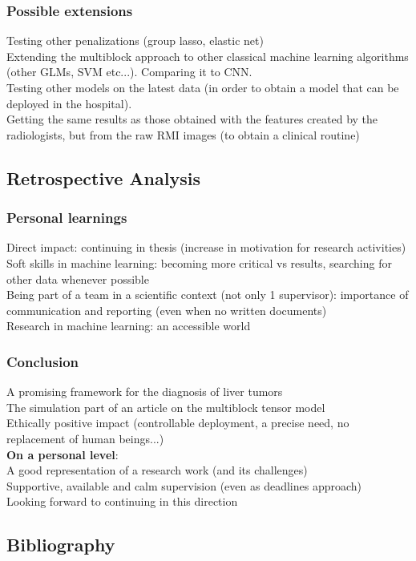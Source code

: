 \documentclass{beamer}
\begin{document}
\begin{frame}
    \frametitle{Possible extensions}
    Testing other penalizations (group lasso, elastic net)\\[10 pt]
    Extending the multiblock approach to other classical machine learning algorithms (other GLMs, SVM etc...). Comparing it to CNN.\\[10 pt]
    Testing other models on the latest data (in order to obtain a model that can be deployed in the hospital).\\[10 pt]
    Getting the same results as those obtained with the features created by the radiologists, but from the raw RMI images (to obtain a clinical routine)
\end{frame}

\begin{frame}
    \section{Retrospective Analysis}
\end{frame}

\begin{frame}
    \frametitle{Personal learnings}
    Direct impact: continuing in thesis (increase in motivation for research activities)\\[10 pt]
    Soft skills in machine learning: becoming more critical vs results, searching for other data whenever possible\\[10 pt]
    Being part of a team in a scientific context (not only 1 supervisor): importance of communication and reporting (even when no written documents)\\[10 pt]
    Research in machine learning: an accessible world
\end{frame}


\begin{frame}
    \frametitle{Conclusion}
    A promising framework for the diagnosis of liver tumors\\[10 pt]
    The simulation part of an article on the multiblock tensor model\\[10 pt]
    Ethically positive impact (controllable deployment, a precise need, no replacement of human beings...)\\[20 pt]
    \textbf{On a personal level}:\\[5 pt]
    A good representation of a research work (and its challenges)\\[10 pt]
    Supportive, available and calm supervision (even as deadlines approach)\\[10 pt]
    Looking forward to continuing in this direction
\end{frame}

\begin{frame}
\section*{Bibliography}
\end{frame}


\begin{frame}[allowframebreaks] 
    
     
    \end{frame}
\end{document}
